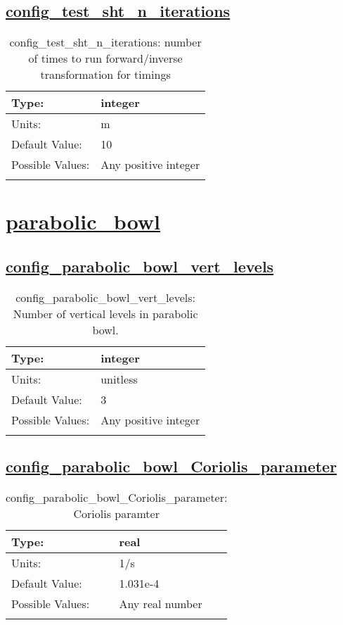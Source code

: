 \subsection[config\_test\_sht\_n\_iterations]{\hyperref[sec:nm_tab_test_sht]{config\_test\_sht\_n\_iterations}}
\label{subsec:nm_sec_config_test_sht_n_iterations}
\begin{center}
\begin{longtable}{| p{2.0in} || p{4.0in} |}
    \hline
    Type: & integer \\
    \hline
    Units: & \si{m} \\
    \hline
    Default Value: & 10 \\
    \hline
    Possible Values: & Any positive integer \\
    \hline
    \caption{config\_test\_sht\_n\_iterations: number of times to run forward/inverse transformation for timings}
\end{longtable}
\end{center}
\section[parabolic\_bowl]{\hyperref[sec:nm_tab_parabolic_bowl]{parabolic\_bowl}}
\label{sec:nm_sec_parabolic_bowl}
\subsection[config\_parabolic\_bowl\_vert\_levels]{\hyperref[sec:nm_tab_parabolic_bowl]{config\_parabolic\_bowl\_vert\_levels}}
\label{subsec:nm_sec_config_parabolic_bowl_vert_levels}
\begin{center}
\begin{longtable}{| p{2.0in} || p{4.0in} |}
    \hline
    Type: & integer \\
    \hline
    Units: & \si{unitless} \\
    \hline
    Default Value: & 3 \\
    \hline
    Possible Values: & Any positive integer \\
    \hline
    \caption{config\_parabolic\_bowl\_vert\_levels: Number of vertical levels in parabolic bowl.}
\end{longtable}
\end{center}
\subsection[config\_parabolic\_bowl\_Coriolis\_parameter]{\hyperref[sec:nm_tab_parabolic_bowl]{config\_parabolic\_bowl\_Coriolis\_parameter}}
\label{subsec:nm_sec_config_parabolic_bowl_Coriolis_parameter}
\begin{center}
\begin{longtable}{| p{2.0in} || p{4.0in} |}
    \hline
    Type: & real \\
    \hline
    Units: & \si{1/s} \\
    \hline
    Default Value: & 1.031e-4 \\
    \hline
    Possible Values: & Any real number \\
    \hline
    \caption{config\_parabolic\_bowl\_Coriolis\_parameter: Coriolis paramter}
\end{longtable}
\end{center}
